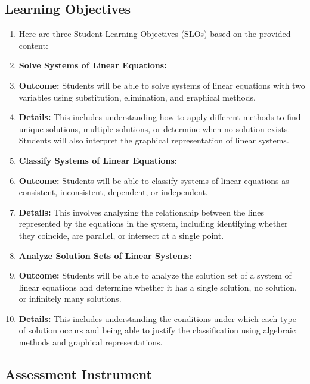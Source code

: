 \subsection{Learning Objectives}
\label{ssec:lear-fe6e}


\begin{enumerate}
    \item Here are three Student Learning Objectives (SLOs) based on the provided content:
    \item \textbf{Solve Systems of Linear Equations:}
    \item \textbf{Outcome:} Students will be able to solve systems of linear equations with two variables using substitution, elimination, and graphical methods.
    \item \textbf{Details:} This includes understanding how to apply different methods to find unique solutions, multiple solutions, or determine when no solution exists. Students will also interpret the graphical representation of linear systems.
    \item \textbf{Classify Systems of Linear Equations:}
    \item \textbf{Outcome:} Students will be able to classify systems of linear equations as consistent, inconsistent, dependent, or independent.
    \item \textbf{Details:} This involves analyzing the relationship between the lines represented by the equations in the system, including identifying whether they coincide, are parallel, or intersect at a single point.
    \item \textbf{Analyze Solution Sets of Linear Systems:}
    \item \textbf{Outcome:} Students will be able to analyze the solution set of a system of linear equations and determine whether it has a single solution, no solution, or infinitely many solutions.
    \item \textbf{Details:} This includes understanding the conditions under which each type of solution occurs and being able to justify the classification using algebraic methods and graphical representations.
\end{enumerate}


\subsection{Assessment Instrument}
\label{ssec:asse-3669}



